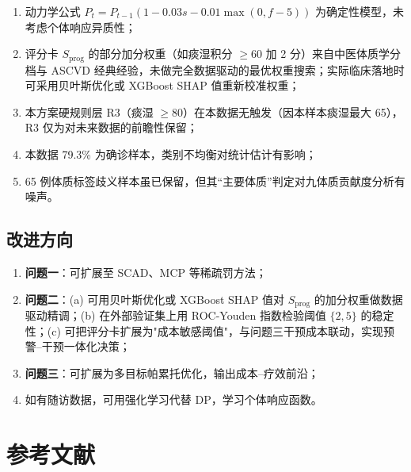 \documentclass{MathorCupmodeling}
\providecommand{\tightlist}{%
  \setlength{\itemsep}{0pt}\setlength{\parskip}{0pt}}
\begin{document}
\begin{enumerate}
\def\labelenumi{(\arabic{enumi})}
\tightlist
\item 动力学公式 $P_t = P_{t-1}(1 - 0.03s - 0.01\max(0, f-5))$ 为确定性模型，未考虑个体响应异质性；
\item 评分卡 $S_{\text{prog}}$ 的部分加分权重（如痰湿积分 $\ge 60$ 加 2 分）来自中医体质学分档与 ASCVD 经典经验，未做完全数据驱动的最优权重搜索；实际临床落地时可采用贝叶斯优化或 XGBoost SHAP 值重新校准权重；
\item 本方案硬规则层 R3（痰湿 $\ge 80$）在本数据无触发（因本样本痰湿最大 65），R3 仅为对未来数据的前瞻性保留；
\item 本数据 79.3\% 为确诊样本，类别不均衡对统计估计有影响；
\item 65 例体质标签歧义样本虽已保留，但其``主要体质''判定对九体质贡献度分析有噪声。
\end{enumerate}

\subsection{改进方向}

\begin{enumerate}
\def\labelenumi{(\arabic{enumi})}
\tightlist
\item \textbf{问题一}：可扩展至 SCAD、MCP 等稀疏罚方法；
\item \textbf{问题二}：(a) 可用贝叶斯优化或 XGBoost SHAP 值对 $S_{\text{prog}}$ 的加分权重做数据驱动精调；(b) 在外部验证集上用 ROC-Youden 指数检验阈值 $\{2, 5\}$ 的稳定性；(c) 可把评分卡扩展为"成本敏感阈值"，与问题三干预成本联动，实现预警--干预一体化决策；
\item \textbf{问题三}：可扩展为多目标帕累托优化，输出成本--疗效前沿；
\item 如有随访数据，可用强化学习代替 DP，学习个体响应函数。
\end{enumerate}

\section{参考文献}
\end{document}
